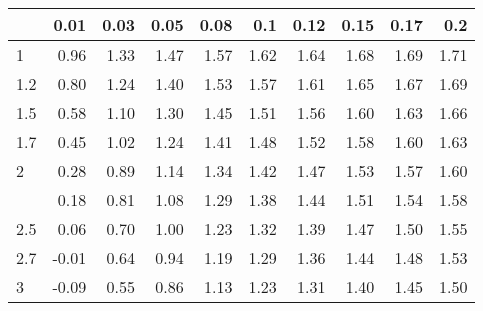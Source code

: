 
\begin{tabular}{lrrrrrrrrr}
\toprule
  & 0.01 & 0.03 & 0.05 & 0.08 & 0.1 & 0.12 & 0.15 & 0.17 & 0.2\\
\midrule
1 & 0.96 & 1.33 & 1.47 & 1.57 & 1.62 & 1.64 & 1.68 & 1.69 & 1.71\\
1.2 & 0.80 & 1.24 & 1.40 & 1.53 & 1.57 & 1.61 & 1.65 & 1.67 & 1.69\\
1.5 & 0.58 & 1.10 & 1.30 & 1.45 & 1.51 & 1.56 & 1.60 & 1.63 & 1.66\\
1.7 & 0.45 & 1.02 & 1.24 & 1.41 & 1.48 & 1.52 & 1.58 & 1.60 & 1.63\\
2 & 0.28 & 0.89 & 1.14 & 1.34 & 1.42 & 1.47 & 1.53 & 1.57 & 1.60\\
\addlinespace
2.2 & 0.18 & 0.81 & 1.08 & 1.29 & 1.38 & 1.44 & 1.51 & 1.54 & 1.58\\
2.5 & 0.06 & 0.70 & 1.00 & 1.23 & 1.32 & 1.39 & 1.47 & 1.50 & 1.55\\
2.7 & -0.01 & 0.64 & 0.94 & 1.19 & 1.29 & 1.36 & 1.44 & 1.48 & 1.53\\
3 & -0.09 & 0.55 & 0.86 & 1.13 & 1.23 & 1.31 & 1.40 & 1.45 & 1.50\\
\bottomrule
\end{tabular}
